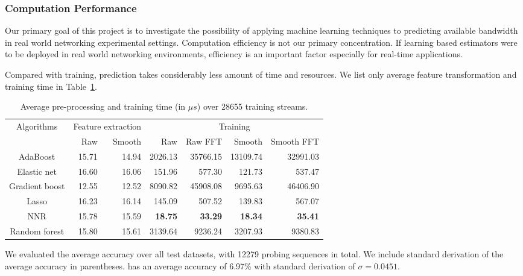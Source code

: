 \subsubsection{Computation Performance}
\label{ssub:computation_performance}

Our primary goal of this project is to investigate the possibility of applying
machine learning techniques to predicting available bandwidth in real world
networking experimental settings. Computation efficiency is not our primary
concentration. If learning based estimators were to be deployed in real world
networking environments, efficiency is an important factor especially for
real-time applications.

Compared with training, prediction takes considerably less amount of time and
resources. We list only average feature transformation and training time in
Table~\ref{tab:timing}.

\begin{table}[htpb]
   \centering
   \caption{Average pre-processing and training time (in $\mu{}s$) over 28655 training streams.}
   \label{tab:timing}
   \begin{tabular}{|c|r|r|r|r|r|r|}
      \hline
      \multirow{2}{*}{Algorithms} & \multicolumn{2}{c|}{Feature extraction} &
      \multicolumn{4}{c|}{Training} \\ \cline{2-7}
                       & Raw   & Smooth & Raw            & Raw FFT        & Smooth         & Smooth FFT \\ \hline
      AdaBoost         & 15.71 & 14.94  & 2026.13        & 35766.15       & 13109.74       & 32991.03\\
      Elastic net      & 16.60 & 16.06  & 151.96         & 577.30         & 121.73         & 537.47\\
      Gradient boost   & 12.55 & 12.52  & 8090.82        & 45908.08       & 9695.63        & 46406.90\\
      Lasso            & 16.23 & 16.14  & 145.09         & 507.52         & 139.83         & 567.07\\
      NNR              & 15.78 & 15.59  & \textbf{18.75} & \textbf{33.29} & \textbf{18.34} & \textbf{35.41}\\
      Random forest    & 15.80 & 15.61  & 3139.64        & 9236.24        & 3207.93        & 9380.83\\
      \hline
   \end{tabular}
\end{table}

We evaluated the average accuracy over all test datasets, with 12279 probing
sequences in total. We include standard derivation of the average
accuracy in parentheses. \cite{Yin2014} has an average accuracy of 6.97\%
with standard derivation of $\sigma=0.0451$.

